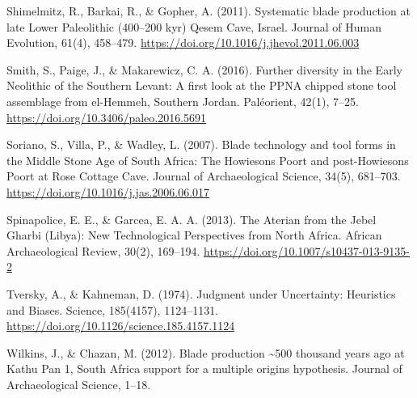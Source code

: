 \documentclass[
]{article}
\begin{document}
Shimelmitz, R., Barkai, R., \& Gopher, A. (2011). Systematic blade
production at late Lower Paleolithic (400--200 kyr) Qesem Cave, Israel.
Journal of Human Evolution, 61(4), 458--479.
\url{https://doi.org/10.1016/j.jhevol.2011.06.003}

Smith, S., Paige, J., \& Makarewicz, C. A. (2016). Further diversity in
the Early Neolithic of the Southern Levant: A first look at the PPNA
chipped stone tool assemblage from el-Hemmeh, Southern Jordan.
Paléorient, 42(1), 7--25. \url{https://doi.org/10.3406/paleo.2016.5691}

Soriano, S., Villa, P., \& Wadley, L. (2007). Blade technology and tool
forms in the Middle Stone Age of South Africa: The Howiesons Poort and
post-Howiesons Poort at Rose Cottage Cave. Journal of Archaeological
Science, 34(5), 681--703.
\url{https://doi.org/10.1016/j.jas.2006.06.017}

Spinapolice, E. E., \& Garcea, E. A. A. (2013). The Aterian from the
Jebel Gharbi (Libya): New Technological Perspectives from North Africa.
African Archaeological Review, 30(2), 169--194.
\url{https://doi.org/10.1007/s10437-013-9135-2}

Tversky, A., \& Kahneman, D. (1974). Judgment under Uncertainty:
Heuristics and Biases. Science, 185(4157), 1124--1131.
\url{https://doi.org/10.1126/science.185.4157.1124}

Wilkins, J., \& Chazan, M. (2012). Blade production \textasciitilde500
thousand years ago at Kathu Pan 1, South Africa support for a multiple
origins hypothesis. Journal of Archaeological Science, 1--18.
\end{document}
